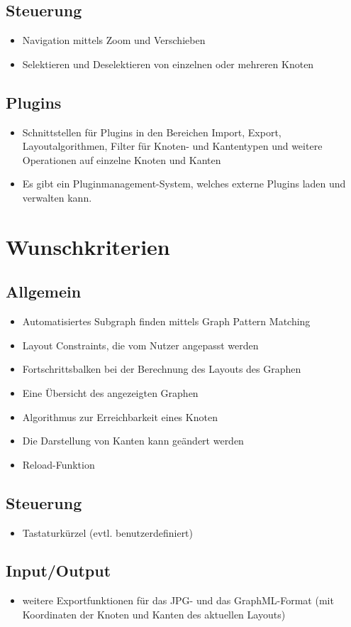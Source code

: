 \subsection{Steuerung}
\begin{itemize}
	\item Navigation mittels Zoom und Verschieben
	\item Selektieren und Deselektieren von einzelnen oder mehreren Knoten
\end{itemize}

\subsection{Plugins}
\begin{itemize}
	\item Schnittstellen für Plugins in den Bereichen Import, Export, Layoutalgorithmen, Filter für Knoten- und Kantentypen und weitere Operationen auf einzelne Knoten und Kanten
	\item Es gibt ein Pluginmanagement-System, welches externe Plugins laden und verwalten kann.
\end{itemize}

\section{Wunschkriterien}

\subsection{Allgemein}
\begin{itemize}
	\item Automatisiertes Subgraph finden mittels Graph Pattern Matching
	\item Layout Constraints, die vom Nutzer angepasst werden
	\item Fortschrittsbalken bei der Berechnung des Layouts des Graphen
	\item Eine Übersicht des angezeigten Graphen
	\item Algorithmus zur Erreichbarkeit eines Knoten
	\item Die Darstellung von Kanten kann geändert werden
	\item Reload-Funktion
\end{itemize}

\subsection{Steuerung}
\begin{itemize}
	\item Tastaturkürzel (evtl. benutzerdefiniert)
\end{itemize}

\subsection{Input/Output}
\begin{itemize}
	\item weitere Exportfunktionen für das JPG- und das GraphML-Format (mit Koordinaten der Knoten und Kanten des aktuellen Layouts)
\end{itemize}
